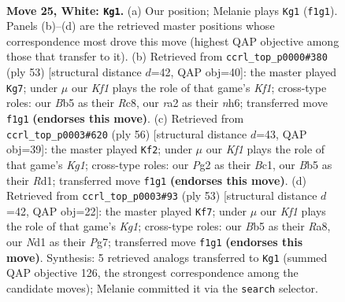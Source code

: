\documentclass[11pt]{article}
\begin{document}
\clearpage

\begin{figure}[p]\centering
\begin{subfigure}{0.46\textwidth}\centering
\resizebox{\linewidth}{!}{%
\newchessgame
\chessboard[
  setfen={1nb2r2/6k1/1p2p1p1/1B2PpN1/6p1/8/r1P2PP1/2RN1K2 w - - 1 25},
  showmover=false,
  pgfstyle=straightmove, color=movearrow, markmove={f1-g1}
]}
\caption{}
\end{subfigure}\hfill
\begin{subfigure}{0.46\textwidth}\centering
\resizebox{\linewidth}{!}{%
\newchessgame
\chessboard[
  setfen={2r2k2/1p3p2/5p1N/p3p3/n6P/Pb2PP1R/1P2B1P1/4K3 b - - 0 27},
  showmover=false,
  pgfstyle=straightmove, color=movearrow, markmove={f8-g7}
]}
\caption{}
\end{subfigure}
\\[4pt]
\begin{subfigure}{0.46\textwidth}\centering
\resizebox{\linewidth}{!}{%
\newchessgame
\chessboard[
  setfen={4r3/pp3k2/5bp1/n1N1pp2/P1P5/2P5/1P4PP/2BR2K1 w - - 3 29},
  showmover=false,
  pgfstyle=straightmove, color=movearrow, markmove={g1-f2}
]}
\caption{}
\end{subfigure}\hfill
\begin{subfigure}{0.46\textwidth}\centering
\resizebox{\linewidth}{!}{%
\newchessgame
\chessboard[
  setfen={r5k1/6p1/p1b2p2/BpNn3p/8/P6P/1P1R1PPK/8 b - - 1 27},
  showmover=false,
  pgfstyle=straightmove, color=movearrow, markmove={g8-f7}
]}
\caption{}
\end{subfigure}
\caption{\textbf{Move 25, White: \texttt{Kg1}.} (a) Our position; Melanie plays \texttt{Kg1} (\texttt{f1g1}). Panels (b)--(d) are the retrieved master positions whose correspondence most drove this move (highest QAP objective among those that transfer to it). (b) Retrieved from \texttt{ccrl\_top\_p0000\#380} (ply 53) [structural distance $d$=42, QAP obj=40]: the master played \texttt{Kg7}; under $\mu$ our \emph{Kf1} plays the role of that game's \emph{Kf1}; cross-type roles: our \emph{B}b5 as their \emph{R}c8, our \emph{r}a2 as their \emph{n}h6; transferred move \texttt{f1g1} \textbf{(endorses this move)}. (c) Retrieved from \texttt{ccrl\_top\_p0003\#620} (ply 56) [structural distance $d$=43, QAP obj=39]: the master played \texttt{Kf2}; under $\mu$ our \emph{Kf1} plays the role of that game's \emph{Kg1}; cross-type roles: our \emph{P}g2 as their \emph{B}c1, our \emph{B}b5 as their \emph{R}d1; transferred move \texttt{f1g1} \textbf{(endorses this move)}. (d) Retrieved from \texttt{ccrl\_top\_p0003\#93} (ply 53) [structural distance $d$=42, QAP obj=22]: the master played \texttt{Kf7}; under $\mu$ our \emph{Kf1} plays the role of that game's \emph{Kg1}; cross-type roles: our \emph{B}b5 as their \emph{R}a8, our \emph{N}d1 as their \emph{P}g7; transferred move \texttt{f1g1} \textbf{(endorses this move)}. Synthesis: 5 retrieved analogs transferred to \texttt{Kg1} (summed QAP objective 126, the strongest correspondence among the candidate moves); Melanie committed it via the \texttt{search} selector.}
\label{fig:thought-m48}
\end{figure}
\end{document}
